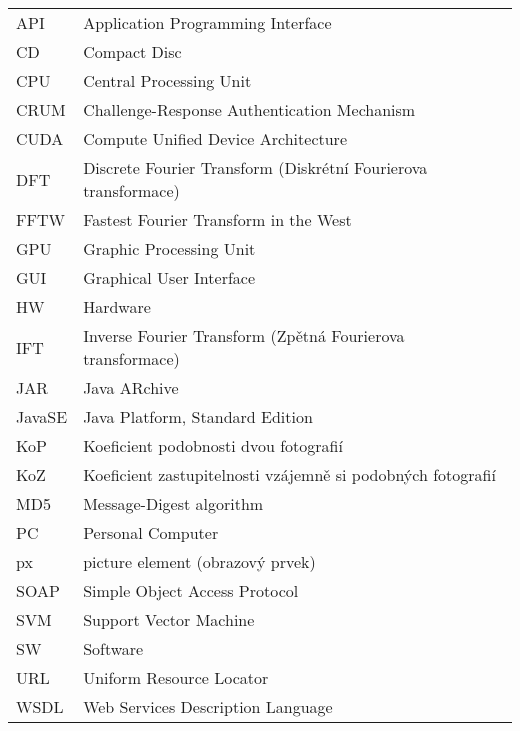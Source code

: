 
\seznamzkr

\begin{tabular}{ll}
  API		& Application Programming Interface									\\
  CD		& Compact Disc														\\
  CPU		& Central Processing Unit											\\
  CRUM		& Challenge-Response Authentication Mechanism						\\
  CUDA		& Compute Unified Device Architecture								\\
  DFT		& Discrete Fourier Transform (Diskrétní Fourierova transformace)	\\
  FFTW		& Fastest Fourier Transform in the West 							\\
  GPU		& Graphic Processing Unit											\\
  GUI		& Graphical User Interface											\\
  HW		& Hardware															\\
  IFT		& Inverse Fourier Transform (Zpětná Fourierova transformace)		\\
  JAR		& Java ARchive														\\
  JavaSE	& Java Platform, Standard Edition									\\
  KoP		& Koeficient podobnosti dvou fotografií								\\
  KoZ		& Koeficient zastupitelnosti vzájemně si podobných fotografií		\\
  MD5		& Message-Digest algorithm											\\
  PC		& Personal Computer													\\
  px		& picture element (obrazový prvek)									\\
  SOAP		& Simple Object Access Protocol										\\
  SVM		& Support Vector Machine											\\
  SW		& Software															\\
  URL		& Uniform Resource Locator											\\
  WSDL		& Web Services Description Language									\\
\end{tabular}

